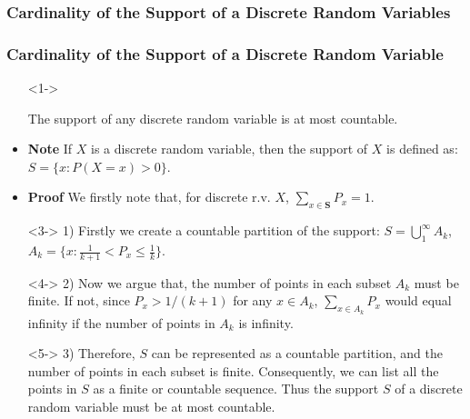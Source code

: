 \documentclass[handout]{beamer}
\begin{document}
\subsubsection{Cardinality of the Support of a Discrete Random Variables}

\frame
{
  \frametitle{Cardinality of the Support of a Discrete Random Variable}

  \begin{itemize}
  \item [] <1-> \begin{Theorem} The support of any discrete random variable is at most countable. \end{Theorem} 
    \item<1-> \textbf{Note}  If $X$ is a discrete random variable, then the support of $X$ is defined as: $S=\{x: P(X=x)>0\}$. 

    \item<2-> \textbf{Proof} We firstly note that, for discrete r.v. $X$, $\sum_{x\in \mathbf{S}} P_x=1$.
  
    \item[]<3->  1) Firstly we  create a countable partition of the support:
$S=\bigcup_{1}^{\infty} A_k $, $A_k=\{x: \frac{1}{k+1}<P_x\leq \frac{1}{k}\}$.

    \item[]<4->  2) Now we argue that, the number of points in each subset $A_k$ must be finite. If not, since $P_x>1/(k+1)$ for any $x\in A_k$, $\sum_{x\in A_k} P_x$ would equal infinity if the number of points in $A_k$ is infinity. 

    \item[]<5->  3) Therefore, $S$ can be represented as a countable partition, and the number of points in each subset is finite. Consequently, we can list all the points in $S$ as a finite or countable sequence. Thus the support $S$ of a discrete random variable must be at most countable.


    
  \end{itemize}
}
\end{document}
